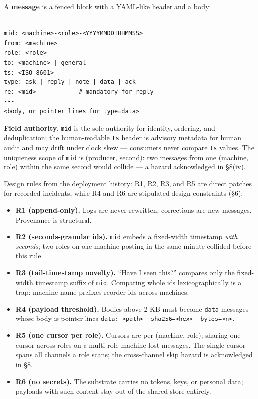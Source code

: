 \documentclass[journal]{IEEEtran}
\providecommand{\tightlist}{\setlength{\itemsep}{0pt}\setlength{\parskip}{0pt}}
\begin{document}
A \textbf{message} is a fenced block with a YAML-like header and a body:

\begin{verbatim}
---
mid: <machine>-<role>-<YYYYMMDDTHHMMSS>
from: <machine>
role: <role>
to: <machine> | general
ts: <ISO-8601>
type: ask | reply | note | data | ack
re: <mid>            # mandatory for reply
---
<body, or pointer lines for type=data>
\end{verbatim}

\textbf{Field authority.} \texttt{mid} is the sole authority for
identity, ordering, and deduplication; the human-readable \texttt{ts}
header is advisory metadata for human audit and may drift under clock
skew --- consumers never compare \texttt{ts} values. The uniqueness
scope of \texttt{mid} is (producer, second): two messages from one
(machine, role) within the same second would collide --- a hazard
acknowledged in §8(iv).

Design rules from the deployment history: R1, R2, R3, and R5 are direct
patches for recorded incidents, while R4 and R6 are stipulated design
constraints (§6):

\begin{itemize}
\tightlist
\item
  \textbf{R1 (append-only).} Logs are never rewritten; corrections are
  new messages. Provenance is structural.
\item
  \textbf{R2 (seconds-granular ids).} \texttt{mid} embeds a fixed-width
  timestamp \emph{with seconds}; two roles on one machine posting in the
  same minute collided before this rule.
\item
  \textbf{R3 (tail-timestamp novelty).} ``Have I seen this?'' compares
  only the fixed-width timestamp suffix of \texttt{mid}. Comparing whole
  ids lexicographically is a trap: machine-name prefixes reorder ids
  across machines.
\item
  \textbf{R4 (payload threshold).} Bodies above 2 KB must become
  \texttt{data} messages whose body is pointer lines
  \texttt{data:\ \textless{}path\textgreater{}\ \ sha256=\textless{}hex\textgreater{}\ \ bytes=\textless{}n\textgreater{}}.
\item
  \textbf{R5 (one cursor per role).} Cursors are per (machine, role);
  sharing one cursor across roles on a multi-role machine lost messages.
  The single cursor spans all channels a role scans; the cross-channel
  skip hazard is acknowledged in §8.
\item
  \textbf{R6 (no secrets).} The substrate carries no tokens, keys, or
  personal data; payloads with such content stay out of the shared store
  entirely.
\end{itemize}
\end{document}
